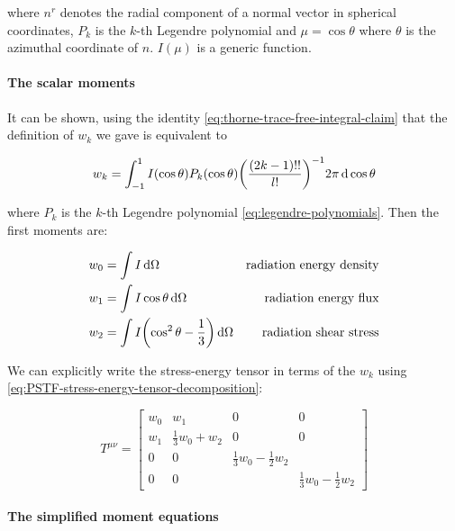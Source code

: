 \documentclass[main.tex]{subfiles}
\begin{document}
where \(n^r\) denotes the radial component of a normal vector in spherical coordinates, \(P_k\) is the \(k\)-th Legendre polynomial and \(\mu = \cos \theta\) where \(\theta\) is the azimuthal coordinate of \(n\). \(I(\mu)\) is a generic function.

\paragraph{The scalar moments}

It can be shown, using the identity \eqref{eq:thorne-trace-free-integral-claim}  that the definition of \(w_k\) we gave is equivalent to

\begin{equation}
    w_k = \int_{-1}^1 I(\cos \theta) P_k(\cos \theta) \qty(\frac{(2k-1)!!}{l!})^{-1} 2 \pi\dd{\cos \theta}
\end{equation}

where \(P_k\) is the \(k\)-th Legendre polynomial \eqref{eq:legendre-polynomials}.
Then the first moments are:

\begin{subequations}
\begin{align}
  w_0 &= \int I \dd{\Omega} & \text{radiation energy density} \\
  w_1 &= \int I \cos \theta \dd{\Omega} & \text{radiation energy flux} \\
  w_2 &= \int I \qty(\cos^2 \theta - \frac{1}{3}) \dd{\Omega} & \text{radiation shear stress}
\end{align}
\end{subequations}

We can explicitly write the stress-energy tensor in terms of the \(w_k\) using \eqref{eq:PSTF-stress-energy-tensor-decomposition}:

\begin{equation}
    T^{\mu\nu} = \begin{bmatrix}
    w_0   & w_1  & 0  & 0 \\
    w_1   & \frac{1}{3}w_0 + w_2  &  0  & 0 \\
      0 & 0  &  \frac{1}{3}w_0 -\frac{1}{2}w_2 &  \\
      0 & 0  &   & \frac{1}{3}w_0 -\frac{1}{2}w_2
    \end{bmatrix}
\end{equation}

\paragraph{The simplified moment equations}
\end{document}
